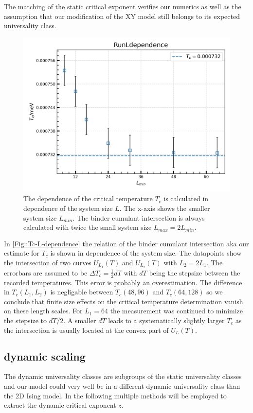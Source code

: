 	The matching of the static critical exponent verifies our numerics as well as the assumption that our modification of the XY model still belongs to its expected universality class. \\
	\begin{figure}[htp]
		\centering
		\includegraphics[width=0.8\linewidth]{graphics/Tc-L.png}
		\caption{The dependence of the critical temperature $T_c$ is calculated in dependence of the system size $L$. The x-axis shows the smaller system size $L_{min}$. The binder cumulant intersection is always calculated with twice the small system size $L_{max} =	2 L_{min}$.}
		\label{Fig::Tc-L-dependence}
	\end{figure}
	In \autoref{Fig::Tc-L-dependence} the relation of the binder cumulant intersection aka our estimate for $T_c$ is shown in dependence of the system size. The datapoints show the intersection of two curves $U_{L_1}(T)$ and $U_{L_2}(T)$ with $L_2 =	2 L_1$. The errorbars are assumed to be $\Delta T_c = \tfrac{1}{2} dT$ with $dT$ being the stepsize between the recorded temperatures. This error is probably an overestimation. The difference in $T_c(L_1, L_2)$ is negligable between $T_c(48, 96)$ and $T_c(64, 128)$ so we conclude that finite size effects on the critical temperature determination vanish on these length scales. For $L_1 =	64$ the measurement was continued to minimize the stepsize to $dT /	2$. A smaller $dT$ leads to a systematically slightly larger $T_c$ as the intersection is usually located at the convex part of $U_L(T)$.  \\
	\subsection{dynamic scaling}
	The dynamic universality classes are subgroups of the static universality classes and our model could very well be in a different dynamic universality class than the 2D Ising model. In the following multiple methods will be employed to extract the dynamic critical exponent $z$.
	
